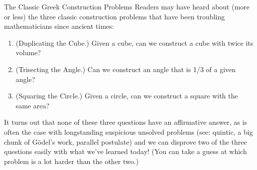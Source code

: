 \documentclass[12pt]{article}
\theoremstyle{definition}
\theoremstyle{definition}
\theoremstyle{definition}
\theoremstyle{definition}
\theoremstyle{definition}
\theoremstyle{definition}
\theoremstyle{definition}
\begin{document}
\newpage

\begin{section}{The Classic Greek Construction Problems}
    Readers may have heard about (more or less) the three classic construction problems that have been troubling mathematicians since ancient times: 
    \begin{enumerate}
        \item (Duplicating the Cube.) Given a cube, can we construct a cube with twice its volume?
        \item (Trisecting the Angle.) Can we construct an angle that is 1/3 of a given angle?
        \item (Squaring the Circle.) Given a circle, can we construct a square with the same area?
    \end{enumerate}
    It turns out that none of these three questions have an affirmative answer, as is often the case with longstanding suspicious unsolved problems (see: quintic,
    a big chunk of G\"odel's work, parallel postulate) and we can disprove two of the three questions easily with what we've learned today! (You can take a guess at 
    which problem is a lot harder than the other two.)


\end{section}
\end{document}
